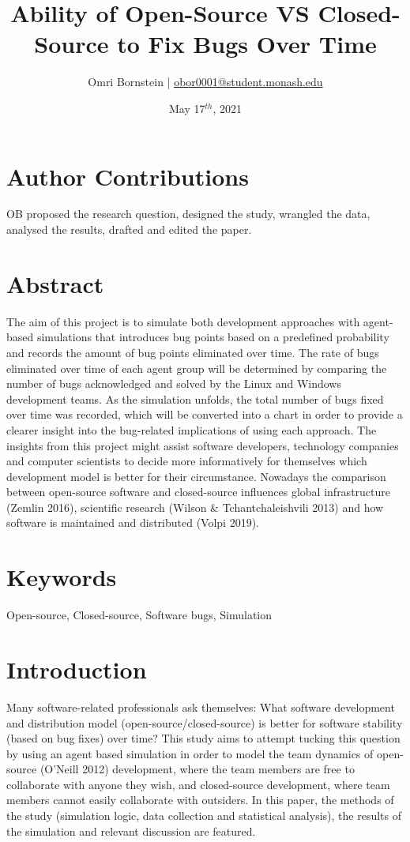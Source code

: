 \documentclass[10pt, a4paper, fleqn]{article}
\title{Ability of Open-Source VS Closed-Source to Fix Bugs Over Time}
\date{May 17$^{th}$, 2021}
\author{Omri Bornstein | \href{mailto:obor0001@student.monash.edu}{obor0001@student.monash.edu}}
\begin{document}
\maketitle
\section*{Author Contributions}
OB proposed the research question, designed the study, wrangled the data, analysed the results, drafted and edited the paper.
\section{Abstract}
The aim of this project is to simulate both development approaches with agent-based simulations that introduces bug points based on a predefined probability and records the amount of bug points eliminated over time. The rate of bugs eliminated over time of each agent group will be determined by comparing the number of bugs acknowledged and solved by the Linux and Windows development teams. As the simulation unfolds, the total number of bugs fixed over time was recorded, which will be converted into a chart in order to provide a clearer insight into the bug-related implications of using each approach. The insights from this project might assist software developers, technology companies and computer scientists to decide more informatively for themselves which development model is better for their circumstance. Nowadays the comparison between open-source software and closed-source influences global infrastructure (Zemlin 2016), scientific research (Wilson \& Tchantchaleishvili 2013) and how software is maintained and distributed (Volpi 2019).
\section{Keywords}
Open-source, Closed-source, Software bugs, Simulation
\section{Introduction}
Many software-related professionals ask themselves: What software development and distribution model (open-source/closed-source) is better for software stability (based on bug fixes) over time? This study aims to attempt tucking this question by using an agent based simulation in order to model the team dynamics of open-source (O’Neill 2012) development, where the team members are free to collaborate with anyone they wish, and closed-source development, where team members cannot easily collaborate with outsiders. In this paper, the methods of the study (simulation logic, data collection and statistical analysis), the results of the simulation and relevant discussion are featured.
\end{document}
